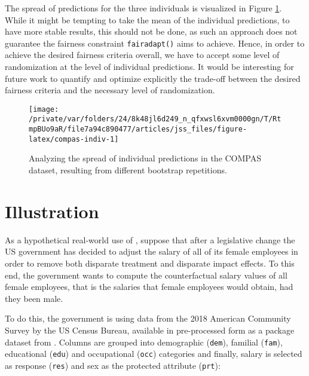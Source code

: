 \documentclass[
  nojss]{jss}
\begin{document}
The spread of predictions for the three individuals is visualized in
Figure \ref{fig:compas-indiv}. While it might be tempting to take the
mean of the individual predictions, to have more stable results, this
should not be done, as such an approach does not guarantee the fairness
constraint \texttt{fairadapt()} aims to achieve. Hence, in order to
achieve the desired fairness criteria overall, we have to accept some
level of randomization at the level of individual predictions. It would
be interesting for future work to quantify and optimize explicitly the
trade-off between the desired fairness criteria and the necessary level
of randomization.

\begin{CodeChunk}
\begin{figure}

{\centering \texttt{[image: /private/var/folders/24/8k48jl6d249\_n\_qfxwsl6xvm0000gn/T/RtmpBUo9aR/file7a94c890477/articles/jss\_files/figure-latex/compas-indiv-1]} 

}

\caption[Analyzing the spread of individual predictions in the COMPAS dataset, resulting from different bootstrap repetitions]{Analyzing the spread of individual predictions in the COMPAS dataset, resulting from different bootstrap repetitions.}\label{fig:compas-indiv}
\end{figure}
\end{CodeChunk}

\hypertarget{illustration}{%
\section{Illustration}\label{illustration}}

As a hypothetical real-world use of , suppose that after
a legislative change the US government has decided to adjust the salary
of all of its female employees in order to remove both disparate
treatment and disparate impact effects. To this end, the government
wants to compute the counterfactual salary values of all female
employees, that is the salaries that female employees would obtain, had
they been male.

To do this, the government is using data from the 2018 American
Community Survey by the US Census Bureau, available in pre-processed
form as a package dataset from . Columns are grouped into
demographic (\texttt{dem}), familial (\texttt{fam}), educational
(\texttt{edu}) and occupational (\texttt{occ}) categories and finally,
salary is selected as response (\texttt{res}) and sex as the protected
attribute (\texttt{prt}):
\end{document}
